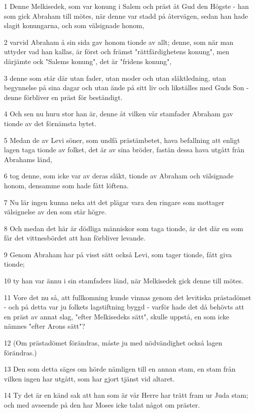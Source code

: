 \par 1 Denne Melkisedek, som var konung i Salem och präst åt Gud den Högste - han som gick Abraham till mötes, när denne var stadd på återvägen, sedan han hade slagit konungarna, och som välsignade honom,
\par 2 varvid Abraham å sin sida gav honom tionde av allt; denne, som när man uttyder vad han kallas, är först och främst "rättfärdighetens konung", men därjämte ock "Salems konung", det är "fridens konung",
\par 3 denne som står där utan fader, utan moder och utan släktledning, utan begynnelse på sina dagar och utan ände på sitt liv och likställes med Guds Son - denne förbliver en präst för beständigt.
\par 4 Och sen nu huru stor han är, denne åt vilken vår stamfader Abraham gav tionde av det förnämsta bytet.
\par 5 Medan de av Levi söner, som undfå prästämbetet, hava befallning att enligt lagen taga tionde av folket, det är av sina bröder, fastän dessa hava utgått från Abrahams länd,
\par 6 tog denne, som icke var av deras släkt, tionde av Abraham och välsignade honom, densamme som hade fått löftena.
\par 7 Nu lär ingen kunna neka att det plägar vara den ringare som mottager välsignelse av den som står högre.
\par 8 Och medan det här är dödliga människor som taga tionde, är det där en som får det vittnesbördet att han förbliver levande.
\par 9 Genom Abraham har på visst sätt också Levi, som tager tionde, fått giva tionde;
\par 10 ty han var ännu i sin stamfaders länd, när Melkisedek gick denne till mötes.
\par 11 Vore det nu så, att fullkomning kunde vinnas genom det levitiska prästadömet - och på detta var ju folkets lagstiftning byggd - varför hade det då behövts att en präst av annat slag, "efter Melkisedeks sätt", skulle uppstå, en som icke nämnes "efter Arons sätt"?
\par 12 (Om prästadömet förändras, måste ju med nödvändighet också lagen förändras.)
\par 13 Den som detta säges om hörde nämligen till en annan stam, en stam från vilken ingen har utgått, som har gjort tjänst vid altaret.
\par 14 Ty det är en känd sak att han som är vår Herre har trätt fram ur Juda stam; och med avseende på den har Moses icke talat något om präster.

